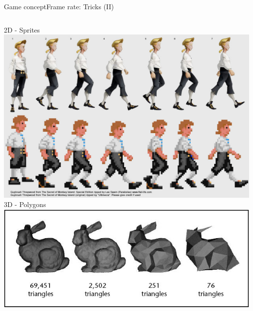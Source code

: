 \documentclass[10pt,compress]{beamer} %
\begin{document}
\begin{frame}{Game concept}{Frame rate: Tricks (II)}
		\vspace{-0.7cm}
    \begin{columns}
		\begin{center}
			2D - Sprites\\
		    \includegraphics[width=0.9\linewidth]{figs/sprites.jpg}\\
			\smallskip
			3D - Polygons\\
		    \includegraphics[width=0.9\linewidth]{figs/lod1}\\
			\smallskip
		\end{center}


\end{columns}
\end{frame}
\end{document}
